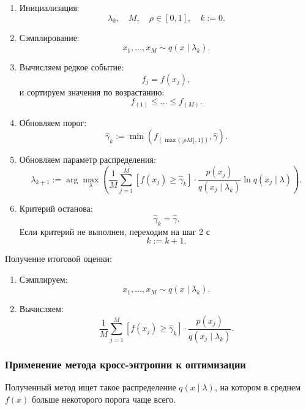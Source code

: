\documentclass[12pt,a4paper]{article}
\begin{document}
\begin{enumerate}
    \item Инициализация:
    \[
    \lambda_0,\quad M,\quad \rho \in [0,1],\quad k:=0.
    \]

    \item Сэмплирование:
    \[
    x_1,\ldots,x_M
    \sim
    q(x \mid \lambda_k).
    \]

    \item Вычисляем редкое событие:
    \[
    f_j = f(x_j),
    \]
    и сортируем значения по возрастанию:
    \[
    f_{(1)} \le \ldots \le f_{(M)}.
    \]

    \item Обновляем порог:
    \[
    \hat\gamma_k
    :=
    \min
    \left(
    f_{(\max\{\lfloor \rho M \rfloor,1\})},
    \hat\gamma
    \right).
    \]

    \item Обновляем параметр распределения:
    \[
    \lambda_{k+1}
    :=
    \arg\max_{\lambda}
    \left(
    \frac{1}{M}
    \sum_{j=1}^{M}
    \left[
    f(x_j) \ge \hat\gamma_k
    \right]
    \cdot
    \frac{p(x_j)}
    {q(x_j \mid \lambda_k)}
    \ln q(x_j \mid \lambda)
    \right).
    \]

    \item Критерий останова:
    \[
    \hat\gamma_k = \hat\gamma.
    \]
    Если критерий не выполнен, переходим на шаг 2 с
    \[
    k := k+1.
    \]
\end{enumerate}

Получение итоговой оценки:

\begin{enumerate}
    \item Сэмплируем:
    \[
    x_1,\ldots,x_M
    \sim
    q(x \mid \lambda_k).
    \]

    \item Вычисляем:
    \[
    \frac{1}{M}
    \sum_{j=1}^{M}
    \left[
    f(x_j) \ge \hat\gamma_k
    \right]
    \cdot
    \frac{p(x_j)}
    {q(x_j \mid \lambda_k)}.
    \]
\end{enumerate}

\subsubsection{Применение метода кросс-энтропии к оптимизации}

Полученный метод ищет такое распределение $q(x \mid \lambda)$, на котором в среднем $f(x)$ больше некоторого порога чаще всего.
\end{document}
